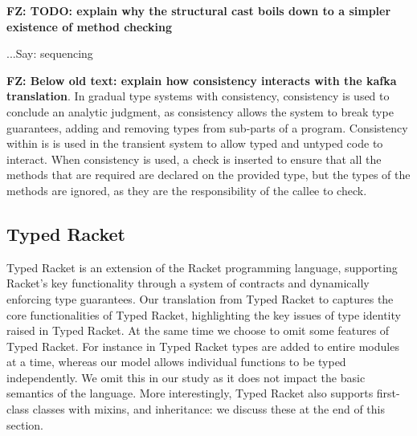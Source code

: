 \documentclass[acmlarge, anonymous, authordraft, review]{acmart} %
\newcommand{\FZ}[1]{\textbf{FZ: #1}}
\begin{document}
\FZ{TODO: explain why the structural cast boils down to a simpler existence of method checking}

...Say: sequencing

%
%

\FZ{Below old text: explain how consistency interacts with the kafka translation}.
 In gradual type systems with consistency, consistency is used to
conclude an analytic judgment, as consistency allows the system to break
type guarantees, adding and removing types from sub-parts of  a
program. Consistency within \kafka is is used in the transient system to allow typed and untyped code to
interact. When consistency is used, a check is inserted to ensure that all
the methods that are required are declared on the provided type, but the
types of the methods are ignored, as they are the responsibility of the
callee to check.




\subsection{Typed Racket}

Typed Racket is an extension of the Racket programming
language, supporting Racket's key functionality 
through a system of contracts and dynamically enforcing type
guarantees.  Our translation from Typed Racket to \kafka captures the core
functionalities of Typed Racket, highlighting the key issues of type identity
raised in Typed Racket.   At the same time we choose to omit some features of Typed Racket.  
For instance in Typed Racket types are added to entire modules at a time, whereas our
model allows individual functions to be typed independently.  We omit this in our study as it does not impact the basic semantics of the language.   More interestingly, Typed Racket also supports first-class classes with mixins, and inheritance:  we discuss these at the end of this section.
\end{document}
